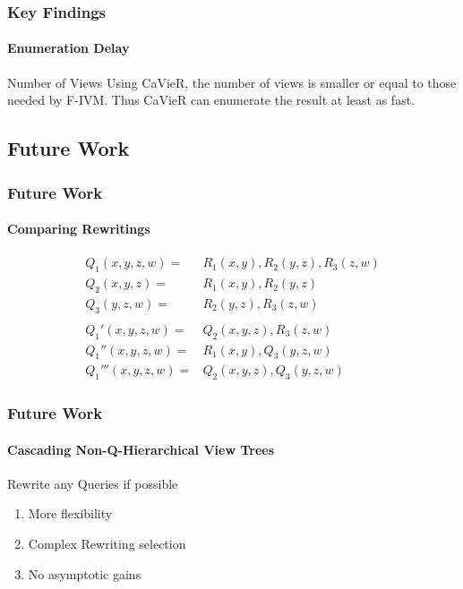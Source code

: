\documentclass[
	11pt, %
]{beamer}
\begin{document}
\begin{frame}
	\frametitle{Key Findings}
	\framesubtitle{Enumeration Delay}
	\begin{block}{Number of Views}
		Using CaVieR, the number of views is smaller or equal to those needed by F-IVM. Thus CaVieR can enumerate the result at least as fast.
	\end{block}
\end{frame}

\subsection{Future Work}
\begin{frame}
	\frametitle{Future Work }
	\framesubtitle{Comparing Rewritings}
	\begin{align*}
		Q_1(x,y,z,w) =&  R_1(x,y), R_2(y,z), R_3(z,w)\\
		Q_2(x,y,z) =&  R_1(x,y), R_2(y,z)\\
		Q_3(y,z,w)=&  R_2(y,z), R_3(z,w)\\\\
		Q_1'(x,y,z,w) =& Q_2(x,y,z), R_3(z,w)\\
		Q_1''(x,y,z,w) =&  R_1(x,y), Q_3(y,z,w)\\
		Q_1'''(x,y,z,w) =&  Q_2(x,y,z), Q_3(y,z,w)
	\end{align*}
\end{frame}

\begin{frame}
	\frametitle{Future Work}
	\framesubtitle{Cascading Non-Q-Hierarchical View Trees}
	\begin{block}{Rewrite any Queries if possible}
		\begin{enumerate}
			\item More flexibility
			\item Complex Rewriting selection
			\item No asymptotic gains
		\end{enumerate}
	\end{block}
\end{frame}
\end{document}
